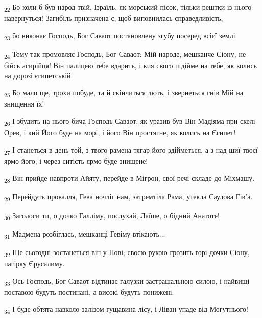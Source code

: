 \begin{tcolorbox}
\textsubscript{22} Бо коли б був народ твій, Ізраїль, як морський пісок, тільки рештки із нього навернуться! Загибіль призначена є, щоб виповнилась справедливість,
\end{tcolorbox}
\begin{tcolorbox}
\textsubscript{23} бо виконає Господь, Бог Саваот постановлену згубу посеред всієї землі.
\end{tcolorbox}
\begin{tcolorbox}
\textsubscript{24} Тому так промовляє Господь, Бог Саваот: Мій народе, мешканче Сіону, не бійсь асирійця! Він палицею тебе вдарить, і кия свого підійме на тебе, як колись на дорозі єгипетській.
\end{tcolorbox}
\begin{tcolorbox}
\textsubscript{25} Бо мало ще, трохи побуде, та й скінчиться лють, і звернеться гнів Мій на знищення їх!
\end{tcolorbox}
\begin{tcolorbox}
\textsubscript{26} І збудить на нього бича Господь Саваот, як уразив був Він Мадіяма при скелі Орев, і кий Його буде на морі, і його Він простягне, як колись на Єгипет!
\end{tcolorbox}
\begin{tcolorbox}
\textsubscript{27} І станеться в день той, з твого рамена тягар його здійметься, а з-над шиї твоєї ярмо його, і через ситість ярмо буде знищене!
\end{tcolorbox}
\begin{tcolorbox}
\textsubscript{28} Він прийде навпроти Айяту, перейде в Мігрон, свої речі складе до Міхмашу.
\end{tcolorbox}
\begin{tcolorbox}
\textsubscript{29} Перейдуть провалля, Гева ночліг нам, затремтіла Рама, утекла Саулова Гів'а.
\end{tcolorbox}
\begin{tcolorbox}
\textsubscript{30} Заголоси ти, о дочко Галліму, послухай, Лаїше, о бідний Анатоте!
\end{tcolorbox}
\begin{tcolorbox}
\textsubscript{31} Мадмена розбіглась, мешканці Гевіму втікають...
\end{tcolorbox}
\begin{tcolorbox}
\textsubscript{32} Ще сьогодні зостанеться він у Нові; своєю рукою грозить горі дочки Сіону, пагірку Єрусалиму.
\end{tcolorbox}
\begin{tcolorbox}
\textsubscript{33} Ось Господь, Бог Саваот відтинає галузки застрашальною силою, і найвищі поставою будуть постинані, а високі будуть понижені.
\end{tcolorbox}
\begin{tcolorbox}
\textsubscript{34} І буде обтята навколо залізом гущавина лісу, і Ліван упаде від Могутнього!
\end{tcolorbox}
